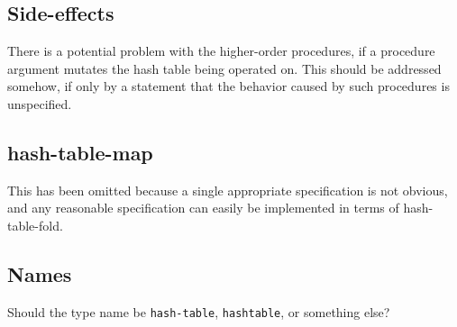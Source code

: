 \documentclass[twoside,twocolumn]{algol60}
\begin{document}
\subsection{Side-effects}
There is a potential problem with the higher-order procedures, if a procedure argument mutates the hash table being operated on.  This should be addressed somehow, if only by a statement that the behavior caused by such procedures is unspecified.

\subsection{hash-table-map}
This has been omitted because a single appropriate specification is not obvious, and any reasonable specification can easily be implemented in terms of {\cf hash-table-fold}.

\subsection{Names}
Should the type name be {\tt hash-table}, {\tt hashtable}, or something else?


\end{document}

